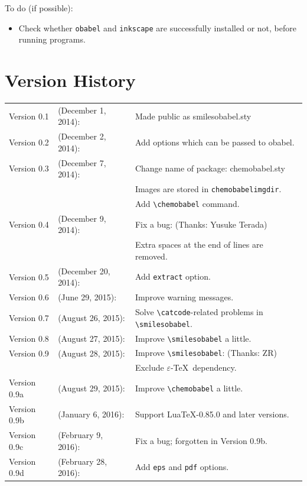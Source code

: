 \documentclass[12pt]{jsarticle}
\begin{document}
\clearpage

To do (if possible):
\begin{itemize}
\item Check whether \texttt{obabel} and \texttt{inkscape} are successfully installed or not, before running programs.
\end{itemize}

\section{Version History}

\begin{table}[h]
\centering
\begin{tabular}{lll}
Version 0.1 & (December  1, 2014): & Made public as \textsf{smilesobabel.sty} \\
Version 0.2 & (December  2, 2014): & Add options which can be passed to obabel. \\
Version 0.3 & (December  7, 2014): & Change name of package: \textsf{chemobabel.sty} \\
            &                      & Images are stored in \texttt{chemobabelimgdir}. \\
            &                      & Add \verb|\chemobabel| command. \\
Version 0.4 & (December  9, 2014): & Fix a bug: (Thanks: Yusuke Terada) \\
            &                      & Extra spaces at the end of lines are removed. \\
Version 0.5 & (December 20, 2014): & Add \verb|extract| option. \\
Version 0.6 & (June     29, 2015): & Improve warning messages. \\
Version 0.7 & (August   26, 2015): & Solve \verb|\catcode|-related problems in \verb|\smilesobabel|. \\
Version 0.8 & (August   27, 2015): & Improve \verb|\smilesobabel| a little. \\
Version 0.9 & (August   28, 2015): & Improve \verb|\smilesobabel|: (Thanks: ZR) \\
            &                      & Exclude $\varepsilon$-\TeX\ dependency. \\
Version 0.9a & (August   29, 2015): & Improve \verb|\chemobabel| a little. \\
Version 0.9b & (January   6, 2016): & Support Lua\TeX-0.85.0 and later versions. \\
Version 0.9c & (February  9, 2016): & Fix a bug; forgotten in Version 0.9b. \\
Version 0.9d & (February 28, 2016): & Add \verb|eps| and \verb|pdf| options.
\end{tabular}
\end{table}
\end{document}
